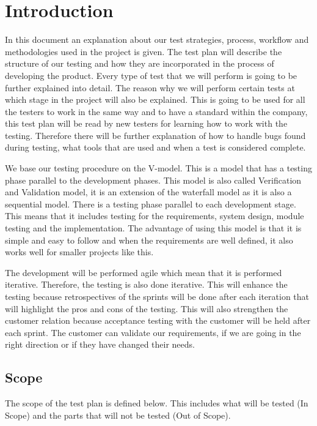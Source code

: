 \section{Introduction}
In this document an explanation about our test strategies, process, workflow and methodologies used in the project is given. The test plan will describe the structure of our testing and how they are incorporated in the process of developing the product. Every type of test that we will perform is going to be further explained into detail. The reason why we will perform certain tests at which stage in the project will also be explained. This is going to be used for all the testers to work in the same way and to have a standard within the company, this test plan will be read by new testers for learning how to work with the testing. Therefore there will be further explanation of how to handle bugs found during testing, what tools that are used and when a test is considered complete. \newline 

\noindent We base our testing procedure on the V-model. This is a model that has a testing phase parallel to the development phases. This model is also called Verification and Validation model, it is an extension of the waterfall model as it is also a sequential model. There is a testing phase parallel to each development stage. This means that it includes testing for the requirements, system design, module testing and the implementation. The advantage of using this model is that it is simple and easy to follow and when the requirements are well defined, it also works well for smaller projects like this.\newline

\noindent The development will be performed agile which mean that it is performed iterative. Therefore, the testing is also done iterative. This will enhance the testing because retrospectives of the sprints will be done after each iteration that will highlight the pros and cons of the testing. This will also strengthen the customer relation because acceptance testing with the customer will be held after each sprint. The customer can validate our requirements, if we are going in the right direction or if they have changed their needs. \newline

\subsection{Scope}
The scope of the test plan is defined below. This includes what will be tested (In Scope) and the parts that will not be tested (Out of Scope).  

